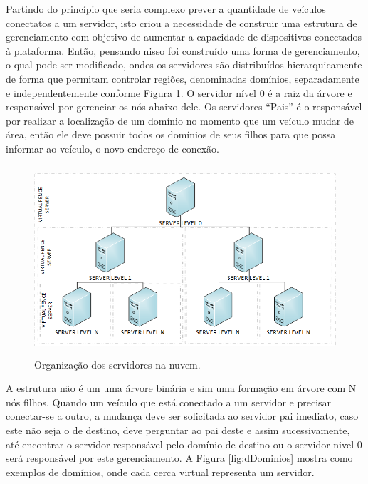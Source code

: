 \documentclass[
	12pt,				%
	oneside,			%
	a4paper,			%
	english,			%
	brazil				%
	]{abntex2ppgsi}
\begin{document}
Partindo do princípio que seria complexo prever a quantidade de veículos conectatos a um servidor, isto criou a necessidade de construir uma estrutura de gerenciamento com objetivo de aumentar a capacidade de dispositivos conectados à plataforma. Então, pensando nisso foi construído uma forma de gerenciamento, o qual pode ser modificado, ondes os servidores são  distribuídos hierarquicamente de forma que permitam controlar regiões, denominadas domínios, separadamente e independentemente conforme Figura \ref{fig:dServidores}. O servidor nível 0 é a raiz da árvore e responsável por gerenciar os nós abaixo dele. Os servidores ``Pais'' é o responsável por realizar a localização de um domínio no momento que um veículo mudar de área, então ele deve possuir todos os domínios de seus filhos para que possa informar ao veículo, o novo endereço de conexão. 


\begin{figure}[h!]
	\centering
	\includegraphics [width=12cm,height=7cm] {images/servidores.png}
	\caption{Organização dos servidores na nuvem.}
	\label{fig:dServidores}
\end{figure}

A estrutura não é um uma árvore binária e sim uma formação em árvore com N nós filhos. Quando um veículo que está conectado a um servidor e precisar conectar-se a outro, a mudança deve ser solicitada ao servidor pai imediato, caso este não seja o de destino, deve perguntar ao pai deste e assim sucessivamente, até encontrar o servidor responsável pelo domínio de destino ou o servidor nivel 0 será responsável por este gerenciamento. A Figura \ref{fig:dDominios} mostra como exemplos de domínios, onde cada cerca virtual representa um servidor.
\end{document}
